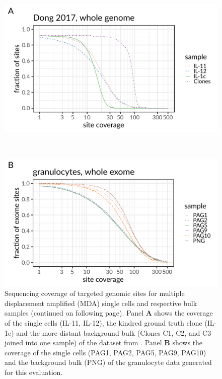 \documentclass[authoryear,preprint,11pt]{scrartcl}
\begin{document}
\begin{figure}[!tpb]
 \begin{minipage}{\linewidth}
  \includegraphics[width=\linewidth]{figs/Dong2017/Dong2017_coverage_dist.pdf}
 \end{minipage} \\
 \begin{minipage}{\linewidth}
  \includegraphics[width=\linewidth]{figs/Laehnemann2017/Laehnemann2017_coverage_dist.pdf}
 \end{minipage}
 \caption{
 Sequencing coverage of targeted genomic sites for multiple displacement amplified (MDA) single cells and respective bulk samples (continued on following page).
 Panel \textbf{A} shows the coverage of the single cells (IL-11, IL-12), the kindred ground truth clone (IL-1c) and the more distant background bulk (Clones C1, C2, and C3 joined into one sample) of the dataset from \cite{dong_accurate_2017}.
 Panel \textbf{B} shows the coverage of the single cells (PAG1, PAG2, PAG5, PAG9, PAG10) and the background bulk (PNG) of the granulocyte data generated for this evaluation.
 }
 \label{fig:coverage-dists}
\end{figure}
\end{document}
